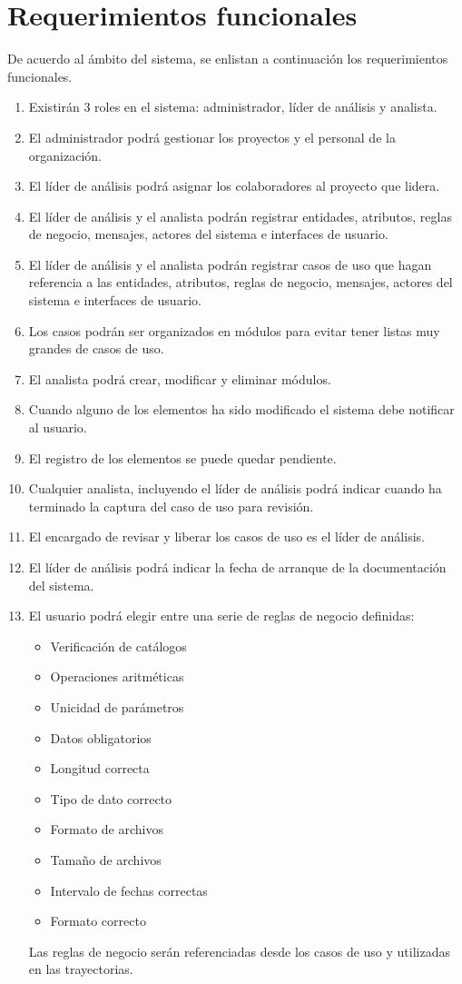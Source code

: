 \section{Requerimientos funcionales}
De acuerdo al ámbito del sistema, se enlistan a continuación los requerimientos funcionales.
\begin{enumerate}[{\bf RF 1.}]
 \item Existirán 3 roles en el sistema: administrador, líder de análisis y analista.
 \item El administrador podrá gestionar los proyectos y el personal de la organización.
 \item El líder de análisis podrá asignar los colaboradores al proyecto que lidera.
 \item El líder de análisis y el analista podrán registrar entidades, atributos, reglas de negocio, mensajes, actores del sistema e interfaces de usuario.
 \item El líder de análisis y el analista podrán registrar casos de uso que hagan referencia a las entidades, atributos, reglas de negocio, mensajes, actores del sistema e interfaces de usuario.
 \item Los casos podrán ser organizados en módulos para evitar tener listas muy grandes de casos de uso.
 \item El analista podrá crear, modificar y eliminar módulos.
 \item Cuando alguno de los elementos ha sido modificado el sistema debe notificar al usuario.
 \item El registro de los elementos se puede quedar pendiente.
 \item Cualquier analista, incluyendo el líder de análisis podrá indicar cuando ha terminado la captura del caso de uso para revisión.
 \item El encargado de revisar y liberar los casos de uso es el líder de análisis.
 \item El líder de análisis podrá indicar la fecha de arranque de la documentación del sistema.
 \item El usuario podrá elegir entre una serie de reglas de negocio definidas:
	\begin{itemize}
		\item Verificación de catálogos
		\item Operaciones aritméticas
		\item Unicidad de parámetros
		\item Datos obligatorios
		\item Longitud correcta
		\item Tipo de dato correcto
		\item Formato de archivos
		\item Tamaño de archivos
		\item Intervalo de fechas correctas
		\item Formato correcto
	\end{itemize}
	Las reglas de negocio serán referenciadas desde los casos de uso y utilizadas en las trayectorias.
\end{enumerate}



